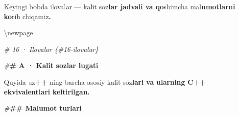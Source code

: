\documentclass[a4paper,11pt,twoside,openright]{book}
\newenvironment{Shaded}{\begin{snugshade}}{\end{snugshade}}
\newcommand{\CharTok}[1]{\textcolor[rgb]{0.31,0.60,0.02}{#1}}
\newcommand{\ErrorTok}[1]{\textcolor[rgb]{0.64,0.00,0.00}{\textbf{#1}}}
\newcommand{\NormalTok}[1]{#1}
\newcommand{\OperatorTok}[1]{\textcolor[rgb]{0.81,0.36,0.00}{\textbf{#1}}}
\newcommand{\PreprocessorTok}[1]{\textcolor[rgb]{0.56,0.35,0.01}{\textit{#1}}}
\begin{document}
\begin{Shaded}
\begin{Highlighting}[]
\NormalTok{Keyingi bobda ilovalar — kalit so}\CharTok{\textquotesingle{}z}\ErrorTok{lar jadvali va qo}\CharTok{\textquotesingle{}}\NormalTok{shimcha ma}\CharTok{\textquotesingle{}l}\ErrorTok{umotlarni ko}\CharTok{\textquotesingle{}}\NormalTok{rib chiqamiz}\OperatorTok{.}


\NormalTok{\textbackslash{}newpage}

\PreprocessorTok{\# 16 · Ilovalar \{\#16{-}ilovalar\}}

\PreprocessorTok{\#}\ErrorTok{\# A · Kalit so\textquotesingle{}zlar lug\textquotesingle{}ati}

\NormalTok{Quyida uz}\OperatorTok{++}\NormalTok{ ning barcha asosiy kalit so}\CharTok{\textquotesingle{}z}\ErrorTok{lari va ularning C++ ekvivalentlari keltirilgan.}

\PreprocessorTok{\#}\ErrorTok{\#\# Ma\textquotesingle{}lumot turlari}


\end{Highlighting}
\end{Shaded}
\end{document}

